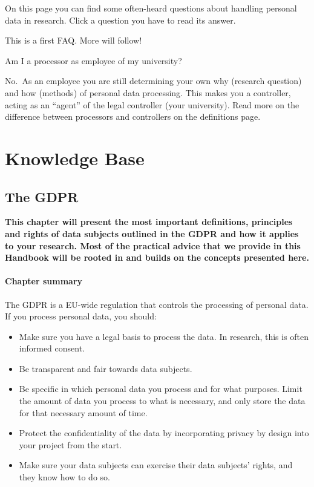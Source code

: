 \documentclass[
]{book}
\providecommand{\tightlist}{%
  \setlength{\itemsep}{0pt}\setlength{\parskip}{0pt}}
\begin{document}
On this page you can find some often-heard questions about handling personal
data in research. Click a question you have to read its answer.

This is a first FAQ. More will follow!

Am I a processor as employee of my university?

No.~As an employee you are still determining your own why (research question)
and how (methods) of personal data processing. This makes you a controller,
acting as an ``agent'' of the legal controller (your university). Read more on the
difference between processors and controllers on the
definitions page.

\hypertarget{part-knowledge-base}{%
\part*{Knowledge Base}\label{part-knowledge-base}}

\hypertarget{gdpr}{%
\chapter*{The GDPR}\label{gdpr}}

\textbf{This chapter will present the most important definitions, principles and rights
of data subjects outlined in the GDPR and how it applies to your research. Most
of the practical advice that we provide in this Handbook will be rooted in and
builds on the concepts presented here.}

\hypertarget{chapter-summary}{%
\subsection{Chapter summary}\label{chapter-summary}}

The GDPR is a EU-wide regulation that controls the processing of personal data.
If you process personal data, you should:

\begin{itemize}
\tightlist
\item
  Make sure you have a legal basis to process the
  data. In research, this is often informed consent.
\item
  Be transparent and fair towards data subjects.
\item
  Be specific in which personal data you process and for what purposes. Limit
  the amount of data you process to what is necessary, and only store the data
  for that necessary amount of time.
\item
  Protect the confidentiality of the data by incorporating
  privacy by design into your project from the start.
\item
  Make sure your data subjects can exercise their
  data subjects' rights, and they know how to
  do so.
\end{itemize}
\end{document}
